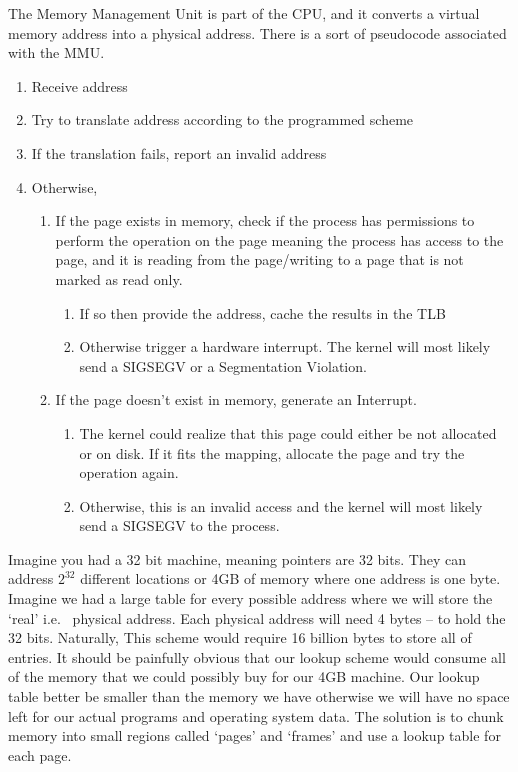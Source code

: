 The Memory Management Unit is part of the CPU, and it converts a virtual memory address into a physical address. There is a sort of pseudocode associated with the MMU.

\begin{enumerate}
\item Receive address
\item Try to translate address according to the programmed scheme
\item If the translation fails, report an invalid address
\item Otherwise,
	\begin{enumerate}
	\item If the page exists in memory, check if the process has permissions
		to perform the operation on the page meaning the process has access
		to the page, and it is reading from the page/writing to a page
		that is not marked as read only.
		\begin{enumerate}
		\item If so then provide the address, cache the results in the TLB
		\item Otherwise trigger a hardware interrupt. The kernel
			will most likely send a SIGSEGV or a Segmentation Violation.
		\end{enumerate}
	\item If the page doesn't exist in memory, generate an Interrupt.
		\begin{enumerate}
		\item The kernel could realize that this page could either be not
			allocated or on disk. If it fits the mapping, allocate the page
			and try the operation again.
		\item Otherwise, this is an invalid access and the kernel will most
			likely send a SIGSEGV to the process.
		\end{enumerate}
	\end{enumerate}
\end{enumerate}

Imagine you had a 32 bit machine, meaning pointers are 32 bits.
They can address $2^{32}$ different locations or 4GB of memory where one address is one byte.
Imagine we had a large table for every possible address where we will store the `real' i.e. ~physical address.
Each physical address will need 4 bytes -- to hold the 32 bits.
Naturally, This scheme would require 16 billion bytes to store all of entries.
It should be painfully obvious that our lookup scheme would consume all of the memory that we could possibly buy for our 4GB machine.
Our lookup table better be smaller than the memory we have otherwise we will have no space left for our actual programs and operating system data.
The solution is to chunk memory into small regions called `pages' and `frames' and use a lookup table for each page.

